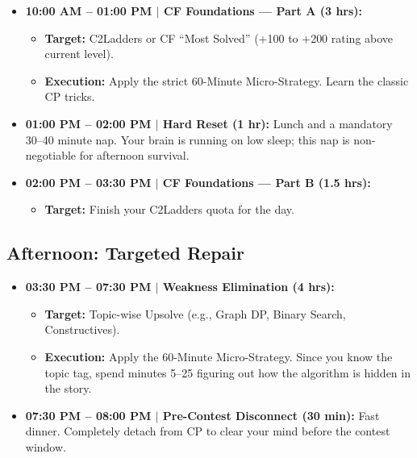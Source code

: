 \documentclass[12pt, a4paper]{article}
\begin{document}
\begin{itemize}[leftmargin=2em, itemsep=6pt]

  \item \textbf{10:00 AM -- 01:00 PM $|$ CF Foundations --- Part A (3 hrs):}
    \begin{itemize}
      \item \textbf{Target:} C2Ladders or CF ``Most Solved''
            (+100 to +200 rating above current level).
      \item \textbf{Execution:} Apply the strict 60-Minute Micro-Strategy.
            Learn the classic CP tricks.
    \end{itemize}

  \item \textbf{01:00 PM -- 02:00 PM $|$ Hard Reset (1 hr):} Lunch and a
        mandatory 30--40 minute nap. Your brain is running on low sleep; this
        nap is non-negotiable for afternoon survival.

  \item \textbf{02:00 PM -- 03:30 PM $|$ CF Foundations --- Part B (1.5 hrs):}
    \begin{itemize}
      \item \textbf{Target:} Finish your C2Ladders quota for the day.
    \end{itemize}

\end{itemize}

\subsection{Afternoon: Targeted Repair}

\begin{itemize}[leftmargin=2em, itemsep=6pt]

  \item \textbf{03:30 PM -- 07:30 PM $|$ Weakness Elimination (4 hrs):}
    \begin{itemize}
      \item \textbf{Target:} Topic-wise Upsolve
            (e.g., Graph DP, Binary Search, Constructives).
      \item \textbf{Execution:} Apply the 60-Minute Micro-Strategy. Since you
            know the topic tag, spend minutes 5--25 figuring out how the
            algorithm is hidden in the story.
    \end{itemize}

  \item \textbf{07:30 PM -- 08:00 PM $|$ Pre-Contest Disconnect (30 min):}
        Fast dinner. Completely detach from CP to clear your mind before the
        contest window.

\end{itemize}
\end{document}
